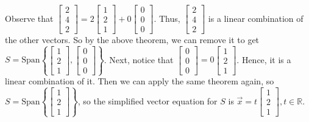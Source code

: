 \documentclass[10pt,letter]{article}
\begin{document}
Observe that $\begin{bmatrix}2\\4\\2\end{bmatrix} = 2\begin{bmatrix}1\\2\\1\end{bmatrix} + 0 \begin{bmatrix}0\\0\\0\end{bmatrix}$. Thus, $\begin{bmatrix}2\\4\\2\end{bmatrix}$ is a linear combination of the other vectors. So by the above theorem, we can remove it to get $S =\text{Span}\left\{ \begin{bmatrix}1\\2\\1\end{bmatrix}, \begin{bmatrix}0\\0\\0\end{bmatrix}\right\}$. Next, notice that $\begin{bmatrix}0\\0\\0\end{bmatrix} = 0\begin{bmatrix}1\\2\\1\end{bmatrix}$. Hence, it is a linear combination of it. Then we can apply the same theorem again, so $S = \text{Span}\left\{\begin{bmatrix}1\\2\\1\end{bmatrix}\right\}$, so the simplified vector equation for $S$ is $\vec{x}=t\begin{bmatrix}1\\2\\1\end{bmatrix}, t\in\mathbb{R}$.
\end{document}
